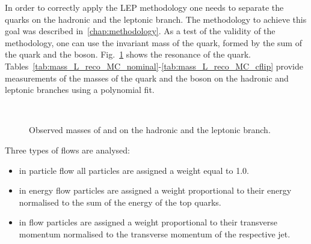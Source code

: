 \label{sec:LEP_methodology}
In order to correctly apply the LEP methodology one needs to separate the \cPqb quarks on the hadronic and the leptonic branch. The methodology to achieve this goal was described in~\ref{chap:methodology}. As a test of the validity of the methodology, one can use the invariant mass of the \cPqt quark, formed by the sum of the \cPqb quark and the \PW boson. Fig.~\ref{fig:L_jet_mass_reco} shows the resonance of the \cPqt quark. Tables~\ref{tab:mass_L_reco_MC_nominal}-\ref{tab:mass_L_reco_MC_cflip} provide measurements of the masses of the \cPqt quark and the \PW boson on the hadronic and leptonic branches using a polynomial fit.

  \begin{figure}[hbtp]
    \def\twidth{0.45}
    \hfil
  \\

 \hfil
 \caption{Observed masses of \PW and \cPqt on the hadronic and the leptonic branch.}
  \label{fig:L_jet_mass_reco}
\end{figure}








Three types of flows are analysed:
\begin{itemize}
\item in particle flow all particles are assigned a weight equal to 1.0.
\item in energy flow particles are assigned a weight proportional to their energy normalised to the sum of the energy of the top quarks.
\item in \pt flow particles are assigned a weight proportional to their transverse momentum normalised to the transverse momentum of the respective jet.
\end{itemize}


